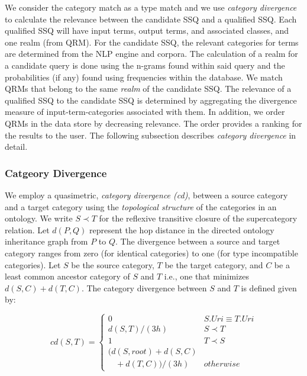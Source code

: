 We consider the category match as a type match and we use 
\emph{category divergence} to calculate the relevance between 
the candidate SSQ and a qualified SSQ. Each qualified SSQ will 
have input terms, output terms, and associated classes, and one realm (from QRM). 
For the candidate SSQ, the relevant categories for terms 
are determined from the NLP engine and corpora. The calculation of a realm 
for a candidate query is done using the n-grams found within said query 
and the probabilities (if any) found using frequencies within the database.
We match QRMs that belong to the same \emph{realm} of the candidate SSQ. 
The relevance of a qualified SSQ to the candidate SSQ is 
determined by aggregating the divergence measure of input-term-categories 
associated with them. In addition, we order QRMs in the data store 
by decreasing relevance. The order provides a ranking for the results 
to the user. The following subsection describes \emph{category divergence} 
in detail.

\subsubsection{Catgeory Divergence}
\label{sec:ctd}

We employ a quasimetric, \textit{category
divergence (cd)},
between a source category and a target category using the \textit{topological
structure} of the categories in an ontology. We write $S \prec T$ for the
reflexive
transitive closure of the supercategory relation. Let $d(P,Q)$ represent the hop
distance in the directed ontology inheritance graph from $P$ to $Q$. The
divergence between a source and target category ranges from zero (for identical
categories) to one (for type incompatible categories). Let $S$ be the source
category, $T$ be
the target category, and $C$ be a least common ancestor category of $S$ and
$T$ i.e., one that minimizes $d(S,C) + d(T,C)$. The category divergence between $S$ and $T$ is defined given by:

\begin{equation}
cd(S, T) = \begin{cases}
0 & S.{Uri} \equiv T.{Uri}\\
d(S, T)/(3h) & S \prec T\\
1 & T \prec S\\
(d(S,root) + d(S,C) \\ \ \ \ \ + d(T,C))/(3h) & otherwise
\end{cases}
\end{equation}

